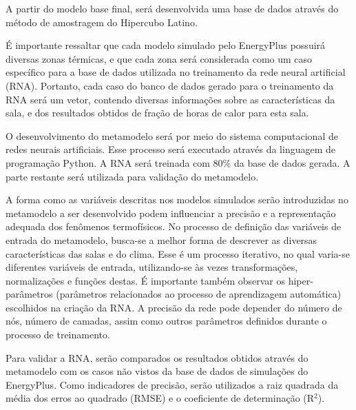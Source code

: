 \documentclass[brazil,hardcopy,openany,a5paper]{ufscthesis}
\begin{document}
		A partir do modelo base final, será desenvolvida uma base de dados através do método de amostragem do Hipercubo Latino.
		
		É importante ressaltar que cada modelo simulado pelo EnergyPlus possuirá diversas zonas térmicas, e que cada zona será considerada como um caso específico para a base de dados utilizada no treinamento da rede neural artificial (RNA). Portanto, cada caso do banco de dados gerado para o treinamento da RNA será um vetor, contendo diversas informações sobre as características da sala, e dos resultados obtidos de fração de horas de calor para esta sala.
		
		O desenvolvimento do metamodelo será por meio do sistema computacional de redes neurais artificiais. Esse processo será executado através da linguagem de programação Python. A RNA será treinada com 80\% da base de dados gerada. A parte restante será utilizada para validação do metamodelo.
		
		A forma como as variáveis descritas nos modelos simulados serão introduzidas no metamodelo a ser desenvolvido podem influenciar a precisão e a representação adequada dos fenômenos termofísicos. No processo de definição das variáveis de entrada do metamodelo, busca-se a melhor forma de descrever as diversas características das salas e do clima. Esse é um processo iterativo, no qual varia-se diferentes variáveis de entrada, utilizando-se às vezes transformações, normalizações e funções destas. É importante também observar os hiper-parâmetros (parâmetros relacionados ao processo de aprendizagem automática) escolhidos na criação da RNA. A precisão da rede pode depender do número de nós, número de camadas, assim como outros parâmetros definidos durante o processo de treinamento.
		
		Para validar a RNA, serão comparados os resultados obtidos através do metamodelo com os casos não vistos da base de dados de simulações do EnergyPlus. Como indicadores de precisão, serão utilizados a raiz quadrada da média dos erros ao quadrado (RMSE) e o coeficiente de determinação (R$^2$).
		

%
%

	
\end{document}
